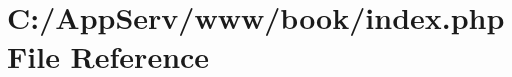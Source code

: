 \hypertarget{index_8php}{
\section{C:/AppServ/www/book/index.php File Reference}
\label{index_8php}
}
